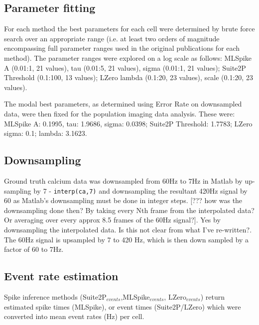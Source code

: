 \documentclass[a4paper,11pt]{article}
\begin{document}
\subsection*{Parameter fitting}
For each method the best parameters for each cell were determined by brute force search over an appropriate range (i.e. at least two orders of magnitude encompassing full parameter ranges used in the original publications for each method). The parameter ranges were explored on a log scale as follows: MLSpike A (0.01:1, 21 values), tau (0.01:5, 21 values), sigma (0.01:1, 21 values); Suite2P Threshold (0.1:100, 13 values);  LZero lambda (0.1:20, 23 values), scale (0.1:20, 23 values). 

The modal best parameters, as determined using Error Rate on downsampled data, were then fixed for the population imaging data analysis. These were: MLSpike A: 0.1995, tau: 1.9686, sigma: 0.0398; Suite2P Threshold: 1.7783; LZero sigma: 0.1; lambda: 3.1623.



\subsection*{Downsampling}
Ground truth calcium data was downsampled from 60Hz to 7Hz in Matlab by up-sampling by 7 - {\tt{interp(ca,7)}} and downsampling the resultant 420Hz signal by 60 as Matlab's downsampling must be done in integer steps.  [??? how was the downsampling done then? By taking every Nth frame from the interpolated data? Or averaging over every approx 8.5 frames of the 60Hz signal?]. {\color{red} Yes by downsampling the interpolated data. Is this not clear from what I've re-written?. The 60Hz signal is upsampled by 7 to 420 Hz, which is then down sampled by a factor of 60 to 7Hz.}


\subsection{Event rate estimation}
Spike inference methods (Suite2P$_{events}$,MLSpike$_{events}$, LZero$_{events}$) return estimated spike times (MLSpike), or event times (Suite2P/LZero) which were converted into mean event rates (Hz) per cell.
\end{document}
